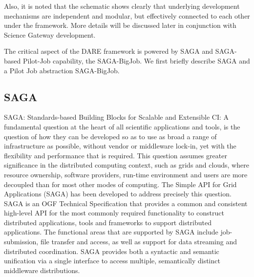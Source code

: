 \documentclass[]{svjour3}
\begin{document}
Also, it is noted that the schematic shows clearly that underlying
development mechanisms are independent and modular, but effectively
connected to each other under the framework. More details will be
discussed later in conjunction with Science Gateway development.

The critical aspect of the DARE framework is powered by SAGA and
SAGA-based Pilot-Job capability, the SAGA-BigJob\cite{saga-ccgrid10}.
We first briefly describe SAGA and a Pilot Job abstraction
SAGA-BigJob.


\subsection{SAGA}



SAGA: Standards-based Building Blocks for Scalable and Extensible CI:
A fundamental question at the heart of all scientific applications and
tools, is the question of how they can be developed so as to use as
broad a range of infrastructure as possible, without vendor or
middleware lock-in, yet with the flexibility and performance that is
required. This question assumes greater significance in the distributed
computing context, such as grids and clouds, where resource ownership,
software providers, run-time environment and users are more decoupled
than for most other modes of computing. The Simple API for Grid
Applications (SAGA) has been developed to address precisely this
question. SAGA\cite{saga_url} is an OGF Technical Specification that
provides a common and consistent high-level API for the most commonly
required functionality to construct distributed applications, tools
and frameworks to support distributed applications. The functional
areas that are supported by SAGA include job-submission, file transfer
and access, as well as support for data streaming and distributed
coordination. SAGA provides both a syntactic and semantic unification
via a single interface to access multiple, semantically distinct
middleware distributions.
\end{document}
